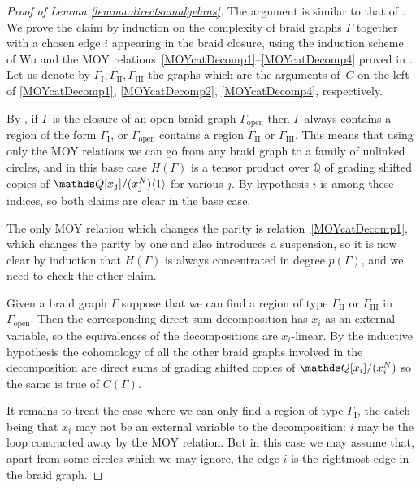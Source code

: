 \documentclass{compositio}
\theoremstyle{definition}
\numberwithin{equation}{section}
\begin{document}
\begin{proof}[Proof of Lemma \ref{lemma:directsumalgebras}]
The argument is similar to that of \cite[Lemma 5.8]{r0607544}. We prove the claim by induction on the complexity of braid graphs $\Gamma$ together with a chosen edge $i$ appearing in the braid closure, using the induction scheme of Wu \cite{Wu} and the MOY relations~\eqref{MOYcatDecomp1}--\eqref{MOYcatDecomp4} proved in \cite[Section 6]{kr0401268}. Let us denote by $\Gamma_{\text{I}}, \Gamma_{\text{II}}, \Gamma_{\text{III}}$ the graphs which are the arguments of~$C$ on the left of \eqref{MOYcatDecomp1}, \eqref{MOYcatDecomp2}, \eqref{MOYcatDecomp4}, respectively. 

By \cite{Wu}, if $\Gamma$ is the closure of an open braid graph $\Gamma_{\text{open}}$ then $\Gamma$ always contains a region of the form $\Gamma_{\text{I}}$, or $\Gamma_{\text{open}}$ contains a region $\Gamma_{\text{II}}$ or $\Gamma_{\text{III}}$. This means that using only the MOY relations we can go from any braid graph to a family of unlinked circles, and in this base case $H(\Gamma)$ is a tensor product over $\mathds{Q}$ of grading shifted copies of $\QQ[x_j]/(x_j^N)\langle 1 \rangle$ for various $j$. By hypothesis $i$ is among these indices, so both claims are clear in the base case.

The only MOY relation which changes the parity is relation~\eqref{MOYcatDecomp1}, which changes the parity by one and also introduces a suspension, so it is now clear by induction that $H(\Gamma)$ is always concentrated in degree $p(\Gamma)$, and we need to check the other claim.

Given a braid graph $\Gamma$ suppose that we can find a region of type $\Gamma_{\text{II}}$ or $\Gamma_{\text{III}}$ in $\Gamma_{\text{open}}$. Then the corresponding direct sum decomposition has $x_i$ as an external variable, so the equivalences of the decompositions are $x_i$-linear. By the inductive hypothesis the cohomology of all the other braid graphs involved in the decomposition are direct sums of grading shifted copies of $\QQ[x_i]/(x_i^N)$ so the same is true of $C(\Gamma)$.

It remains to treat the case where we can only find a region of type $\Gamma_{\text{I}}$, the catch being that $x_i$ may not be an external variable to the decomposition: $i$ may be the loop contracted away by the MOY relation. But in this case we may assume that, apart from some circles which we may ignore, the edge $i$ is the rightmost edge in the braid graph. 


\end{proof}
\end{document}
